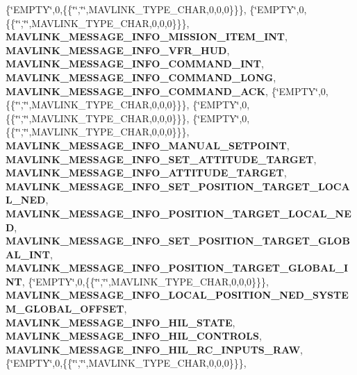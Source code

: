 \begin{DoxyCompactItemize}
\{\char`\"{}E\+M\+P\+TY\char`\"{},0,\{\{\char`\"{}\char`\"{},\char`\"{}\char`\"{},M\+A\+V\+L\+I\+N\+K\+\_\+\+T\+Y\+P\+E\+\_\+\+C\+H\+AR,0,0,0\}\}\}, \{\char`\"{}E\+M\+P\+TY\char`\"{},0,\{\{\char`\"{}\char`\"{},\char`\"{}\char`\"{},M\+A\+V\+L\+I\+N\+K\+\_\+\+T\+Y\+P\+E\+\_\+\+C\+H\+AR,0,0,0\}\}\}, \textbf{ M\+A\+V\+L\+I\+N\+K\+\_\+\+M\+E\+S\+S\+A\+G\+E\+\_\+\+I\+N\+F\+O\+\_\+\+M\+I\+S\+S\+I\+O\+N\+\_\+\+I\+T\+E\+M\+\_\+\+I\+NT}, \textbf{ M\+A\+V\+L\+I\+N\+K\+\_\+\+M\+E\+S\+S\+A\+G\+E\+\_\+\+I\+N\+F\+O\+\_\+\+V\+F\+R\+\_\+\+H\+UD}, \textbf{ M\+A\+V\+L\+I\+N\+K\+\_\+\+M\+E\+S\+S\+A\+G\+E\+\_\+\+I\+N\+F\+O\+\_\+\+C\+O\+M\+M\+A\+N\+D\+\_\+\+I\+NT}, \textbf{ M\+A\+V\+L\+I\+N\+K\+\_\+\+M\+E\+S\+S\+A\+G\+E\+\_\+\+I\+N\+F\+O\+\_\+\+C\+O\+M\+M\+A\+N\+D\+\_\+\+L\+O\+NG}, \textbf{ M\+A\+V\+L\+I\+N\+K\+\_\+\+M\+E\+S\+S\+A\+G\+E\+\_\+\+I\+N\+F\+O\+\_\+\+C\+O\+M\+M\+A\+N\+D\+\_\+\+A\+CK}, \{\char`\"{}E\+M\+P\+TY\char`\"{},0,\{\{\char`\"{}\char`\"{},\char`\"{}\char`\"{},M\+A\+V\+L\+I\+N\+K\+\_\+\+T\+Y\+P\+E\+\_\+\+C\+H\+AR,0,0,0\}\}\}, \{\char`\"{}E\+M\+P\+TY\char`\"{},0,\{\{\char`\"{}\char`\"{},\char`\"{}\char`\"{},M\+A\+V\+L\+I\+N\+K\+\_\+\+T\+Y\+P\+E\+\_\+\+C\+H\+AR,0,0,0\}\}\}, \{\char`\"{}E\+M\+P\+TY\char`\"{},0,\{\{\char`\"{}\char`\"{},\char`\"{}\char`\"{},M\+A\+V\+L\+I\+N\+K\+\_\+\+T\+Y\+P\+E\+\_\+\+C\+H\+AR,0,0,0\}\}\}, \textbf{ M\+A\+V\+L\+I\+N\+K\+\_\+\+M\+E\+S\+S\+A\+G\+E\+\_\+\+I\+N\+F\+O\+\_\+\+M\+A\+N\+U\+A\+L\+\_\+\+S\+E\+T\+P\+O\+I\+NT}, \textbf{ M\+A\+V\+L\+I\+N\+K\+\_\+\+M\+E\+S\+S\+A\+G\+E\+\_\+\+I\+N\+F\+O\+\_\+\+S\+E\+T\+\_\+\+A\+T\+T\+I\+T\+U\+D\+E\+\_\+\+T\+A\+R\+G\+ET}, \textbf{ M\+A\+V\+L\+I\+N\+K\+\_\+\+M\+E\+S\+S\+A\+G\+E\+\_\+\+I\+N\+F\+O\+\_\+\+A\+T\+T\+I\+T\+U\+D\+E\+\_\+\+T\+A\+R\+G\+ET}, \textbf{ M\+A\+V\+L\+I\+N\+K\+\_\+\+M\+E\+S\+S\+A\+G\+E\+\_\+\+I\+N\+F\+O\+\_\+\+S\+E\+T\+\_\+\+P\+O\+S\+I\+T\+I\+O\+N\+\_\+\+T\+A\+R\+G\+E\+T\+\_\+\+L\+O\+C\+A\+L\+\_\+\+N\+ED}, \textbf{ M\+A\+V\+L\+I\+N\+K\+\_\+\+M\+E\+S\+S\+A\+G\+E\+\_\+\+I\+N\+F\+O\+\_\+\+P\+O\+S\+I\+T\+I\+O\+N\+\_\+\+T\+A\+R\+G\+E\+T\+\_\+\+L\+O\+C\+A\+L\+\_\+\+N\+ED}, \textbf{ M\+A\+V\+L\+I\+N\+K\+\_\+\+M\+E\+S\+S\+A\+G\+E\+\_\+\+I\+N\+F\+O\+\_\+\+S\+E\+T\+\_\+\+P\+O\+S\+I\+T\+I\+O\+N\+\_\+\+T\+A\+R\+G\+E\+T\+\_\+\+G\+L\+O\+B\+A\+L\+\_\+\+I\+NT}, \textbf{ M\+A\+V\+L\+I\+N\+K\+\_\+\+M\+E\+S\+S\+A\+G\+E\+\_\+\+I\+N\+F\+O\+\_\+\+P\+O\+S\+I\+T\+I\+O\+N\+\_\+\+T\+A\+R\+G\+E\+T\+\_\+\+G\+L\+O\+B\+A\+L\+\_\+\+I\+NT}, \{\char`\"{}E\+M\+P\+TY\char`\"{},0,\{\{\char`\"{}\char`\"{},\char`\"{}\char`\"{},M\+A\+V\+L\+I\+N\+K\+\_\+\+T\+Y\+P\+E\+\_\+\+C\+H\+AR,0,0,0\}\}\}, \textbf{ M\+A\+V\+L\+I\+N\+K\+\_\+\+M\+E\+S\+S\+A\+G\+E\+\_\+\+I\+N\+F\+O\+\_\+\+L\+O\+C\+A\+L\+\_\+\+P\+O\+S\+I\+T\+I\+O\+N\+\_\+\+N\+E\+D\+\_\+\+S\+Y\+S\+T\+E\+M\+\_\+\+G\+L\+O\+B\+A\+L\+\_\+\+O\+F\+F\+S\+ET}, \textbf{ M\+A\+V\+L\+I\+N\+K\+\_\+\+M\+E\+S\+S\+A\+G\+E\+\_\+\+I\+N\+F\+O\+\_\+\+H\+I\+L\+\_\+\+S\+T\+A\+TE}, \textbf{ M\+A\+V\+L\+I\+N\+K\+\_\+\+M\+E\+S\+S\+A\+G\+E\+\_\+\+I\+N\+F\+O\+\_\+\+H\+I\+L\+\_\+\+C\+O\+N\+T\+R\+O\+LS}, \textbf{ M\+A\+V\+L\+I\+N\+K\+\_\+\+M\+E\+S\+S\+A\+G\+E\+\_\+\+I\+N\+F\+O\+\_\+\+H\+I\+L\+\_\+\+R\+C\+\_\+\+I\+N\+P\+U\+T\+S\+\_\+\+R\+AW}, \{\char`\"{}E\+M\+P\+TY\char`\"{},0,\{\{\char`\"{}\char`\"{},\char`\"{}\char`\"{},M\+A\+V\+L\+I\+N\+K\+\_\+\+T\+Y\+P\+E\+\_\+\+C\+H\+AR,0,0,0\}\}\}, 
\end{DoxyCompactItemize}
